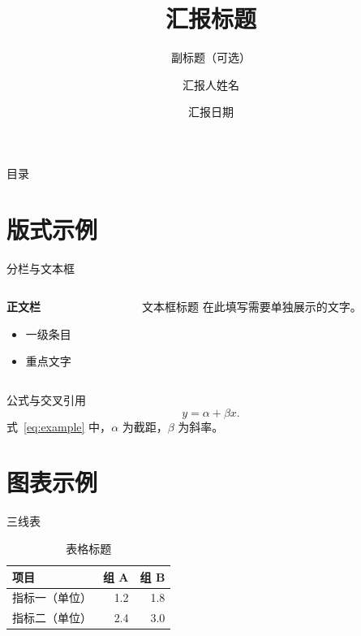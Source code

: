 \documentclass[11pt,aspectratio=43,compress]{beamer}
\title[汇报标题]{汇报标题}
\subtitle{副标题（可选）}
\author[汇报人]{汇报人姓名}
\institute[机构]{机构名称}
\date{汇报日期}
\begin{document}
\begin{frame}
  \titlepage
\end{frame}

\begin{frame}{目录}
  \tableofcontents
\end{frame}

\section{版式示例}

\begin{frame}{分栏与文本框}
  \begin{columns}[T,onlytextwidth]
    \begin{column}{.47\textwidth}
      \textbf{正文栏}
      \begin{itemize}
        \item 一级条目
        \item \alert{重点文字}
      \end{itemize}
    \end{column}
    \begin{column}{.47\textwidth}
      \begin{block}{文本框标题}
        在此填写需要单独展示的文字。
      \end{block}
    \end{column}
  \end{columns}
\end{frame}

\begin{frame}{公式与交叉引用}
  \begin{equation}\label{eq:example}
    y = \alpha + \beta x.
  \end{equation}
  式~\eqref{eq:example} 中，$\alpha$ 为截距，$\beta$ 为斜率。
\end{frame}

\section{图表示例}

\begin{frame}{三线表}
  \begin{table}
    \centering
    \caption{表格标题}\label{tab:example}
    \begin{tabularx}{.84\textwidth}{@{}Yrr@{}}
      \toprule
      项目 & 组 A & 组 B \\
      \midrule
      指标一（单位） & 1.2 & 1.8 \\
      指标二（单位） & 2.4 & 3.0 \\
      \bottomrule
    \end{tabularx}
  \end{table}
\end{frame}
\end{document}
